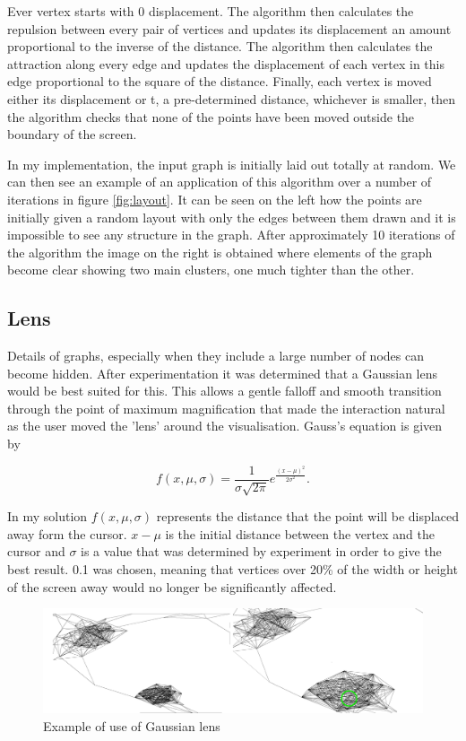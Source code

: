 \documentclass[12pt,a4paper]{article}
\begin{document}
Ever vertex starts with 0 displacement. The algorithm then calculates the repulsion between every pair of vertices and updates its displacement an amount proportional to the inverse of the distance. The algorithm then calculates the attraction along every edge and updates the displacement of each vertex in this edge proportional to the square of the distance. Finally, each vertex is moved either its displacement or t, a pre-determined distance, whichever is smaller, then the algorithm checks that none of the points have been moved outside the boundary of the screen.

In my implementation, the input graph is initially laid out totally at random. We can then see an example of an application of this algorithm over a number of iterations in figure \ref{fig:layout}. It can be seen on the left how the points are initially given a random layout with only the edges between them drawn and it is impossible to see any structure in the graph. After approximately 10 iterations of the algorithm the image on the right is obtained where elements of the graph become clear showing two main clusters, one much tighter than the other.

\subsection{Lens}
\noindent
Details of graphs, especially when they include a large number of nodes can become hidden. After experimentation it was determined that a Gaussian lens would be best suited for this. This allows a gentle falloff and smooth transition through the point of maximum magnification that made the interaction natural as the user moved the 'lens' around the visualisation. Gauss's equation is given by 

\begin{equation}
\label{eq:Guass}
f(x,\mu,\sigma)=\frac{1}{\sigma\sqrt{2\pi}}e^{\frac{(x-\mu)^{2}}{2\sigma^{2}}}.
\end{equation}

In my solution $f(x, \mu, \sigma)$ represents the distance that the point will be displaced away form the cursor. $x-\mu$ is the initial distance between the vertex and the cursor and $\sigma$ is a value that was determined by experiment in order to give the best result. 0.1 was chosen, meaning that vertices over 20\% of the width or height of the screen away would no longer be significantly affected.

\begin{figure}[htb]
\caption{Example of use of Gaussian lens}
\label{fig:lens}
\centering
\includegraphics[scale=0.12]{Gaussian.png}
\end{figure}
\end{document}

